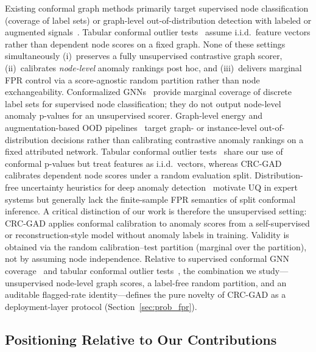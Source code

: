 \documentclass[a4paper]{cas-dc}
\theoremstyle{definition}
\begin{document}
Existing conformal graph methods primarily target supervised node classification (coverage of label sets) or graph-level out-of-distribution detection with labeled or augmented signals~\cite{huang2024uncertainty,liu2024conformal}.  Tabular conformal outlier tests~\cite{bates2023testing} assume i.i.d.\ feature vectors rather than dependent node scores on a fixed graph.  None of these settings simultaneously (i)~preserves a fully unsupervised contrastive graph scorer, (ii)~calibrates \emph{node-level} anomaly rankings post hoc, and (iii)~delivers marginal FPR control via a score-agnostic random partition rather than node exchangeability.
Conformalized GNNs~\cite{huang2024uncertainty} provide marginal coverage of discrete label sets for supervised node classification; they do not output node-level anomaly p-values for an unsupervised scorer.  Graph-level energy and augmentation-based OOD pipelines~\cite{liu2024conformal} target graph- or instance-level out-of-distribution decisions rather than calibrating contrastive anomaly rankings on a fixed attributed network.  Tabular conformal outlier tests~\cite{bates2023testing} share our use of conformal p-values but treat features as i.i.d.\ vectors, whereas CRC-GAD calibrates dependent node scores under a random evaluation split.  Distribution-free uncertainty heuristics for deep anomaly detection~\cite{zhang2024eswauncertainty} motivate UQ in expert systems but generally lack the finite-sample FPR semantics of split conformal inference.
A critical distinction of our work is therefore the unsupervised setting: CRC-GAD applies conformal calibration to anomaly scores from a self-supervised or reconstruction-style model without anomaly labels in training.  Validity is obtained via the random calibration--test partition (marginal over the partition), not by assuming node independence.  Relative to supervised conformal GNN coverage~\cite{huang2024uncertainty} and tabular conformal outlier tests~\cite{bates2023testing}, the combination we study---unsupervised node-level graph scores, a label-free random partition, and an auditable flagged-rate identity---defines the pure novelty of CRC-GAD as a deployment-layer protocol (Section~\ref{sec:prob_fpr}).

\subsection{Positioning Relative to Our Contributions}
\label{sec:rw_positioning}
\end{document}
